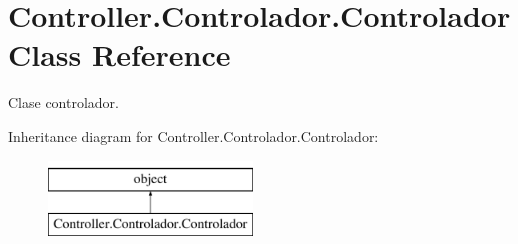 \hypertarget{class_controller_1_1_controlador_1_1_controlador}{}\section{Controller.\+Controlador.\+Controlador Class Reference}
\label{class_controller_1_1_controlador_1_1_controlador}


Clase controlador.  


Inheritance diagram for Controller.\+Controlador.\+Controlador\+:\begin{figure}[H]
\begin{center}
\leavevmode
\includegraphics[height=2.000000cm]{class_controller_1_1_controlador_1_1_controlador}
\end{center}
\end{figure}
